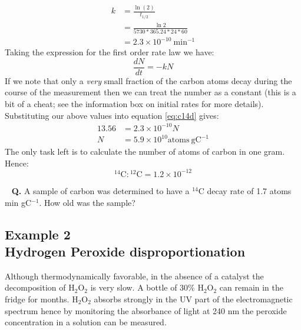 \documentclass[	DIV=calc,%
							paper=a4,%
							fontsize=11pt,%
							twocolumn]{scrartcl}	 					%
\begin{document}
\begin{align}
    k &= \frac{\ln(2)}{t_{1/2}} \\
     &= \frac{\ln2}{5730*365.24*24*60} \\
     &= 2.3\times10^{-10}~\mathrm{min}^{-1}
\end{align}
Taking the expression for the first order rate law we have:
\begin{equation}
    \frac{dN}{dt} = -kN
    \label{eq:c14d}
\end{equation}
If we note that only a \emph{very} small fraction of the carbon atoms decay during the course of the measurement then we can treat the number as a constant (this is a bit of a cheat; see the information box on initial rates for more details). Substituting our above values into equation \ref{eq:c14d} gives:
\begin{align}
    13.56 &= 2.3\times10^{-10} N\\
    N &= 5.9\times 10^{10} \mathrm{atoms~gC^{-1}}
\end{align}
The only task left is to calculate the number of atoms of carbon in one gram.
Hence:
\begin{equation}
    ^{14}\mathrm{C}:{^{12}\mathrm{C}} = 1.2\times10^{-12}
\end{equation}

~
\newline
\textbf{Q.} A sample of carbon was determined to have a $^{14}$C decay rate of 1.7 atoms min gC$^{-1}$. How old was the sample?


\subsection*{Example 2\\Hydrogen Peroxide disproportionation}
Although thermodynamically favorable, in the absence of a catalyst the decomposition of $\mathrm{H_2O_2}$ is very slow. A bottle of 30\% $\mathrm{H_2O_2}$ can remain in the fridge for months. $\mathrm{H_2O_2}$ absorbs strongly in the UV part of the electromagnetic spectrum hence by monitoring the absorbance of light at 240 nm the peroxide concentration in a solution can be measured. 
\end{document}
